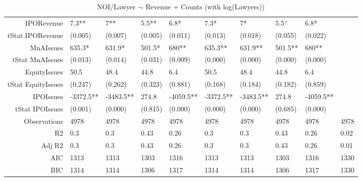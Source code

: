 \begin{table}[ht]
\begin{tabular}{rlllllllll}
  IPORevenue & 7.3** & 7** & 5.5** & 6.8* & 7.3* & 7* & 5.5$^{+}$ & 6.8* &  \\ 
  tStat IPORevenue & (0.005) & (0.007) & (0.005) & (0.011) & (0.013) & (0.018) & (0.055) & (0.022) &  \\ 
  MnAIssues & 635.3* & 631.9* & 501.5* & 680** & 635.3** & 631.9** & 501.5** & 680** &  \\ 
  tStat MnAIssues & (0.013) & (0.014) & (0.031) & (0.009) & (0.000) & (0.000) & (0.000) & (0.000) &  \\ 
  EquityIssues & 50.5 & 48.4 & 44.8 & 6.4 & 50.5 & 48.4 & 44.8 & 6.4 &  \\ 
  tStat EquityIssues & (0.247) & (0.262) & (0.323) & (0.881) & (0.168) & (0.184) & (0.182) & (0.859) &  \\ 
  IPOIssues & -3372.5** & -3483.5** & 274.8 & -4059.5** & -3372.5** & -3483.5** & 274.8 & -4059.5** &  \\ 
  tStat IPOIssues & (0.001) & (0.000) & (0.815) & (0.000) & (0.000) & (0.000) & (0.685) & (0.000) &  \\ 
  Observations & 4978 & 4978 & 4978 & 4978 & 4978 & 4978 & 4978 & 4978 & 4978 \\ 
  R2 & 0.3 & 0.3 & 0.43 & 0.26 & 0.3 & 0.3 & 0.43 & 0.26 & 0.02 \\ 
  Adj R2 & 0.3 & 0.3 & 0.43 & 0.26 & 0.3 & 0.3 & 0.43 & 0.26 & 0.01 \\ 
  AIC & 1313 & 1313 & 1303 & 1316 & 1313 & 1313 & 1303 & 1316 & 1330 \\ 
  BIC & 1314 & 1314 & 1306 & 1317 & 1314 & 1314 & 1306 & 1317 & 1330 \\ 
   \hline
\end{tabular}
\caption{NOI/Lawyer $\sim$ Revenue + Counts (with log(Lawyers))} 
\end{table}

